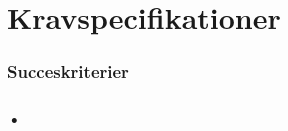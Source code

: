 \chapter{Kravspecifikationer}\label{Kravspecifikationer}

\subsection{Succeskriterier}\label{Succeskriterier}

\subsection{•}
